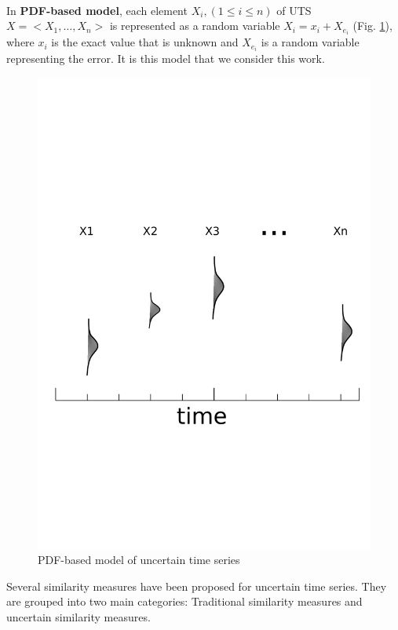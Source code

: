 \paragraph{} In \textbf{PDF-based model}, each element $X_i, (1\leq i \leq n)$ of UTS $X = <X_1, \ldots, X_n>$ is   represented as a random variable $X_i=x_i + X_{e_i}$ (Fig. \ref{pdf}), where $x_i$ is the exact value that is   unknown and $X_{e_i}$ is a random variable representing the error. It is this model that we  consider this work.
  
  \begin{figure}[h]
  \centering
   \includegraphics[scale=0.4]{images/pdf2}
  \caption{PDF-based model of uncertain time series}
  \label{pdf}
  \end{figure}
  


Several similarity measures have been proposed for uncertain time series. They are grouped into two main categories: Traditional similarity measures and uncertain similarity measures.


